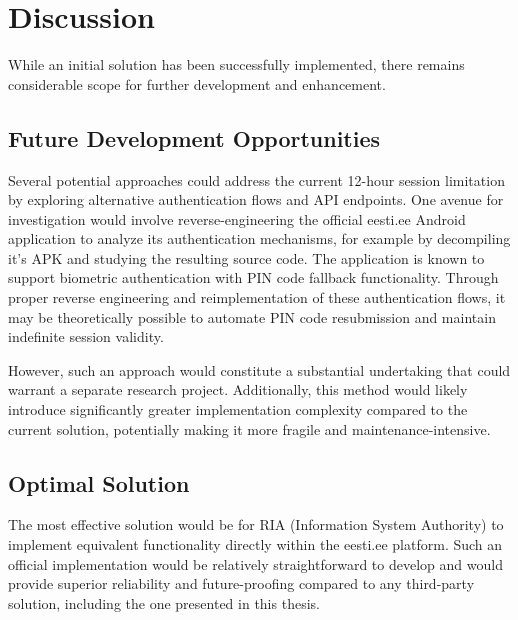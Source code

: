 \section{Discussion}

While an initial solution has been successfully implemented, there remains considerable scope for further development and enhancement.

\subsection{Future Development Opportunities}

Several potential approaches could address the current 12-hour session limitation by exploring alternative authentication flows and API endpoints. One avenue for investigation would involve reverse-engineering the official eesti.ee Android application to analyze its authentication mechanisms, for example by decompiling it's APK and studying the resulting source code. The application is known to support biometric authentication with PIN code fallback functionality. Through proper reverse engineering and reimplementation of these authentication flows, it may be theoretically possible to automate PIN code resubmission and maintain indefinite session validity.

However, such an approach would constitute a substantial undertaking that could warrant a separate research project. Additionally, this method would likely introduce significantly greater implementation complexity compared to the current solution, potentially making it more fragile and maintenance-intensive.

\subsection{Optimal Solution}

The most effective solution would be for RIA (Information System Authority) to implement equivalent functionality directly within the eesti.ee platform. Such an official implementation would be relatively straightforward to develop and would provide superior reliability and future-proofing compared to any third-party solution, including the one presented in this thesis.